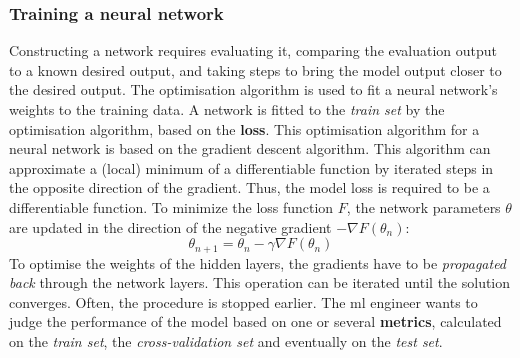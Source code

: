 \subsubsection{Training a neural network}

\par{
    Constructing a network requires evaluating it, comparing the evaluation output to a known desired output, and taking steps to bring the model output closer to the desired output. 
    The optimisation algorithm is used to fit a neural network's weights to the training data.
    A network is fitted to the \textit{train set} by the optimisation algorithm, based on the \textbf{loss}.
    This optimisation algorithm for a neural network is based on the gradient descent algorithm. 
    This algorithm can approximate a (local) minimum of a differentiable function by iterated steps in the opposite direction of the gradient.
    Thus, the model loss is required to be a differentiable function.
    To minimize the loss function $F$, the network parameters $\theta$ are updated in the direction of the negative gradient $-\nabla F(\theta_n)$:
    \begin{equation}
        \theta_{n+1} = \theta_n - \gamma \nabla F(\theta_n) \label{eq:gradDesc}
    \end{equation}
    To optimise the weights of the hidden layers, the gradients have to be \textit{propagated back} through the network layers.
    This operation can be iterated until the solution converges. Often, the procedure is stopped earlier.
    The \acrshort{ml} engineer wants to judge the performance of the model based on one or several \textbf{metrics}, calculated on the \textit{train set}, 
    the \textit{cross-validation set} and eventually on the \textit{test set}.
}
